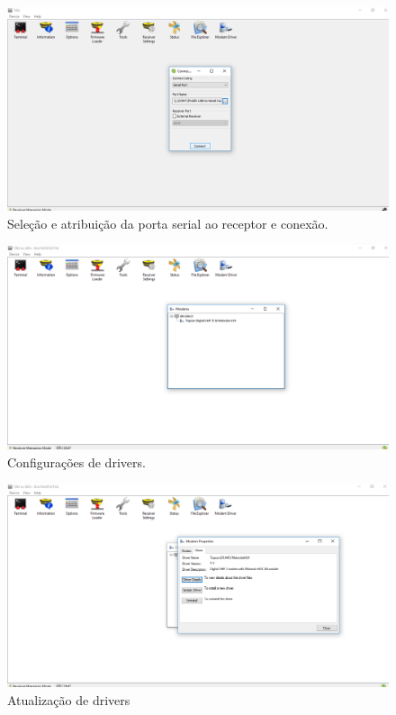 \begin{figure}[H]
\centering
\includegraphics[scale=0.4]{img/3.png} %
\caption{Seleção e atribuição da porta serial ao receptor e conexão.}
\label{Rotulo}
\end{figure}


\begin{figure}[H]
\centering
\includegraphics[scale=0.4]{img/4.png} %
\caption{Configurações de drivers.}
\label{Rotulo}
\end{figure}


\begin{figure}[H]
\centering
\includegraphics[scale=0.4]{img/5.png} %
\caption{Atualização de drivers}
\label{Rotulo}
\end{figure}


